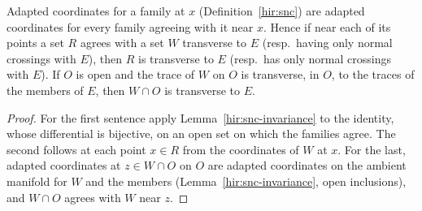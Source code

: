 \begin{lemma}
\label{bcalc:normal-crossings-local}
\leanok
Adapted coordinates for a family at \(x\) (Definition~\ref{hir:snc}) are adapted coordinates for every family agreeing with it near \(x\). Hence if near each
of its points a set \(R\) agrees with a set \(W\) transverse to \(E\) (resp.\ having only normal crossings with \(E\)), then \(R\) is transverse to \(E\)
(resp.\ has only normal crossings with \(E\)). If \(O\) is open and the trace of \(W\) on \(O\) is transverse, in \(O\), to the traces of the members of \(E\), then
\(W\cap O\) is transverse to \(E\).
\end{lemma}
\begin{proof}
\leanok
For the first sentence apply Lemma~\ref{hir:snc-invariance} to the identity, whose differential is bijective, on an open set on which the families agree.
The second follows at each point \(x\in R\) from the coordinates of \(W\) at \(x\). For the last, adapted coordinates at \(z\in W\cap O\) on \(O\) are adapted
coordinates on the ambient manifold for \(W\) and the members (Lemma~\ref{hir:snc-invariance}, open inclusions), and \(W\cap O\) agrees with \(W\) near \(z\).
\end{proof}


